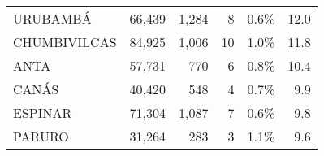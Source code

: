 \begin{tabular}{lrrrrr}
	\cellcolor[HTML]{FFFC9E}URUBAMBÁ      & 66,439                                                         & 1,284                                                                           & 8                                                              & 0.6\%                                                                  & 12.0                                                                                                                               \\
	\cellcolor[HTML]{FFFC9E}CHUMBIVILCAS  & 84,925                                                         & 1,006                                                                           & 10                                                             & 1.0\%                                                                  & 11.8                                                                                                                               \\
	\cellcolor[HTML]{FFFC9E}ANTA          & 57,731                                                         & 770                                                                             & 6                                                              & 0.8\%                                                                  & 10.4                                                                                                                               \\
	\cellcolor[HTML]{FFFC9E}CANÁS         & 40,420                                                         & 548                                                                             & 4                                                              & 0.7\%                                                                  & 9.9                                                                                                                                \\
	\cellcolor[HTML]{FFFC9E}ESPINAR       & 71,304                                                         & 1,087                                                                           & 7                                                              & 0.6\%                                                                  & 9.8                                                                                                                                \\
	\cellcolor[HTML]{FFFC9E}PARURO        & 31,264                                                         & 283                                                                             & 3                                                              & 1.1\%                                                                  & 9.6                                                                                                                                \\

\end{tabular}
